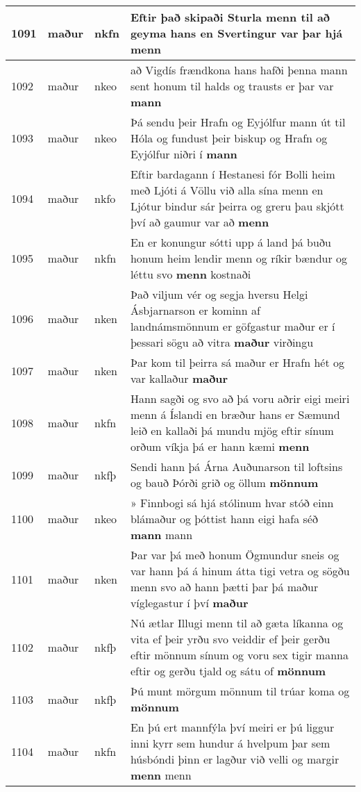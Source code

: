 \documentclass{article}
\begin{document}
\begin{longtable}{p{1cm}|p{1cm}|p{1cm}|p{13cm}}
\hline
1091&maður&nkfn&Eftir það skipaði Sturla menn til að geyma hans en Svertingur var þar hjá \textbf{menn} \\
\hline
1092&maður&nkeo&að Vigdís frændkona hans hafði þenna mann sent honum til halds og trausts er þar var \textbf{mann} \\
\hline
1093&maður&nkeo&Þá sendu þeir Hrafn og Eyjólfur mann út til Hóla og fundust þeir biskup og Hrafn og Eyjólfur niðri í \textbf{mann} \\
\hline
1094&maður&nkfo&Eftir bardagann í Hestanesi fór Bolli heim með Ljóti á Völlu við alla sína menn en Ljótur bindur sár þeirra og greru þau skjótt því að gaumur var að \textbf{menn} \\
\hline
1095&maður&nkfn&En er konungur sótti upp á land þá buðu honum heim lendir menn og ríkir bændur og léttu svo \textbf{menn} kostnaði\\
\hline
1096&maður&nken&Það viljum vér og segja hversu Helgi Ásbjarnarson er kominn af landnámsmönnum er göfgastur maður er í þessari sögu að vitra \textbf{maður} virðingu\\
\hline
1097&maður&nken&Þar kom til þeirra sá maður er Hrafn hét og var kallaður \textbf{maður} \\
\hline
1098&maður&nkfn&Hann sagði og svo að þá voru aðrir eigi meiri menn á Íslandi en bræður hans er Sæmund leið en kallaði þá mundu mjög eftir sínum orðum víkja þá er hann kæmi \textbf{menn} \\
\hline
1099&maður&nkfþ&Sendi hann þá Árna Auðunarson til loftsins og bauð Þórði grið og öllum \textbf{mönnum} \\
\hline
1100&maður&nkeo&» Finnbogi sá hjá stólinum hvar stóð einn blámaður og þóttist hann eigi hafa séð \textbf{mann} mann\\
\hline
1101&maður&nken&Þar var þá með honum Ögmundur sneis og var hann þá á hinum átta tigi vetra og sögðu menn svo að hann þætti þar þá maður víglegastur í því \textbf{maður} \\
\hline
1102&maður&nkfþ&Nú ætlar Illugi menn til að gæta líkanna og vita ef þeir yrðu svo veiddir ef þeir gerðu eftir mönnum sínum og voru sex tigir manna eftir og gerðu tjald og sátu of \textbf{mönnum} \\
\hline
1103&maður&nkfþ&Þú munt mörgum mönnum til trúar koma og \textbf{mönnum} \\
\hline
1104&maður&nkfn&En þú ert mannfýla því meiri er þú liggur inni kyrr sem hundur á hvelpum þar sem húsbóndi þinn er lagður við velli og margir \textbf{menn} menn\\

\end{longtable}
\end{document}
